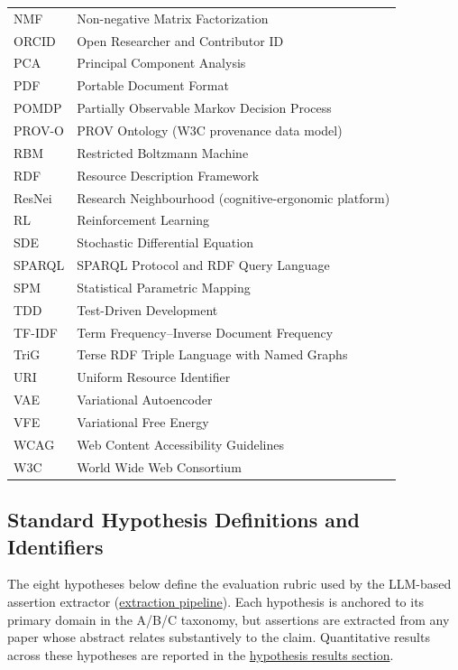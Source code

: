 \documentclass[
  english,
]{article}
\begin{document}
\begin{table}[H]
\begin{tabular}{ll}
NMF & Non-negative Matrix Factorization \\
ORCID & Open Researcher and Contributor ID \\
PCA & Principal Component Analysis \\
PDF & Portable Document Format \\
POMDP & Partially Observable Markov Decision Process \\
PROV-O & PROV Ontology (W3C provenance data model) \\
RBM & Restricted Boltzmann Machine \\
RDF & Resource Description Framework \\
ResNei & Research Neighbourhood (cognitive-ergonomic platform) \\
RL & Reinforcement Learning \\
SDE & Stochastic Differential Equation \\
SPARQL & SPARQL Protocol and RDF Query Language \\
SPM & Statistical Parametric Mapping \\
TDD & Test-Driven Development \\
TF-IDF & Term Frequency--Inverse Document Frequency \\
TriG & Terse RDF Triple Language with Named Graphs \\
URI & Uniform Resource Identifier \\
VAE & Variational Autoencoder \\
VFE & Variational Free Energy \\
WCAG & Web Content Accessibility Guidelines \\
W3C & World Wide Web Consortium \\
\bottomrule
\end{tabular}
\end{table}

\subsection{Standard Hypothesis Definitions and
Identifiers}\label{standard-hypothesis-definitions-and-identifiers}

The eight hypotheses below define the evaluation rubric used by the
LLM-based assertion extractor
(\hyperref[sec:extraction_pipeline]{extraction pipeline}). Each
hypothesis is anchored to its primary domain in the A/B/C taxonomy, but
assertions are extracted from any paper whose abstract relates
substantively to the claim. Quantitative results across these hypotheses
are reported in the
\hyperref[sec:hypothesis_results]{hypothesis results section}.
\end{document}
